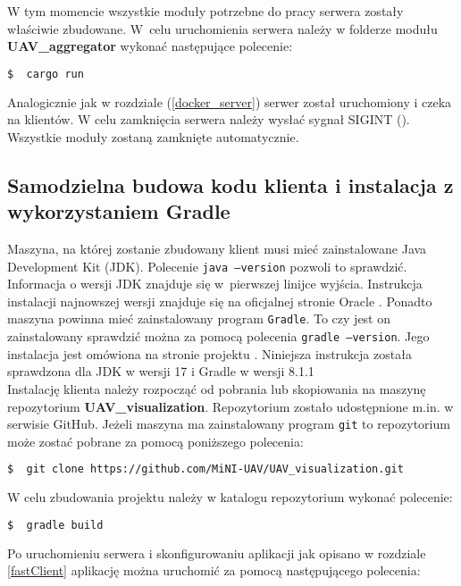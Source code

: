 W tym momencie wszystkie moduły potrzebne do pracy serwera zostały właściwie zbudowane. W~celu uruchomienia serwera należy w folderze modułu\\ \textbf{UAV\_aggregator} wykonać następujące polecenie:
\begin{lstlisting}[language=bash]
  $  cargo run
\end{lstlisting}

Analogicznie jak w rozdziale (\ref{docker_server}) serwer został uruchomiony i czeka na klientów. W celu zamknięcia serwera należy wysłać sygnał SIGINT (). Wszystkie moduły zostaną zamknięte automatycznie.

\subsection{Samodzielna budowa kodu klienta i instalacja z wykorzystaniem Gradle}
 
Maszyna, na której zostanie zbudowany klient musi mieć zainstalowane Java Development Kit (JDK). Polecenie \texttt{java --version} pozwoli to sprawdzić. Informacja o wersji JDK znajduje się w~pierwszej linijce wyjścia. Instrukcja instalacji najnowszej wersji znajduje się na oficjalnej stronie Oracle \cite{javaDown}. Ponadto maszyna powinna mieć zainstalowany program \texttt{Gradle}. To czy jest on zainstalowany sprawdzić można za pomocą polecenia \texttt{gradle --version}. Jego instalacja jest omówiona na stronie projektu \cite{gradle}. Niniejsza instrukcja została sprawdzona dla JDK w wersji 17 i Gradle w wersji 8.1.1 \\


Instalację klienta należy rozpocząć od pobrania lub skopiowania na maszynę repozytorium \textbf{UAV\_visualization}. Repozytorium zostało udostępnione m.in. w serwisie GitHub. Jeżeli maszyna ma zainstalowany program \texttt{git} to repozytorium może zostać pobrane za pomocą poniższego polecenia:

\begin{lstlisting}[language=bash]
  $  git clone https://github.com/MiNI-UAV/UAV_visualization.git 
\end{lstlisting}

W celu zbudowania projektu należy w katalogu repozytorium wykonać polecenie:

\begin{lstlisting}[language=bash]
  $  gradle build
\end{lstlisting} 

Po uruchomieniu serwera i skonfigurowaniu aplikacji jak opisano w rozdziale \ref{fastClient} aplikację można uruchomić za pomocą następującego polecenia:

